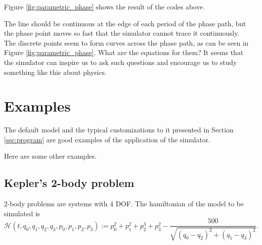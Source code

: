 \documentclass[12pt]{article}
\begin{document}
Figure \ref{fig:parametric_phase} shows the result of the codes above.

The line should be continuous at the edge of each period of the phase path,
but the phase point moves so fast that the simulator cannot trace it continuously.
The discrete points seem to form curves across the phase path,
as can be seen in Figure \ref{fig:parametric_phase}.
What are the equations for them?
It seems that the simulator can inspire us to ask such questions
and encourage us to study something like this about physics.

\section{Examples}
\label{sec:examples}

The default model and the typical customizations to it presented in Section \ref{sec:program}
are good examples of the application of the simulator.

Here are some other examples.

\subsection{Kepler's 2-body problem}

2-body problems are systems with $4$ DOF.
The hamiltonian of the model to be simulated is
\begin{equation*}
  \mathcal H\left(t,q_0,q_1,q_2,q_3,p_0,p_1,p_2,p_3\right):=
  p_0^2+p_1^2+p_2^3+p_3^2-\frac{500}{\sqrt{\left(q_0-q_2\right)^2+\left(q_1-q_3\right)^2}}.
\end{equation*}
\end{document}
